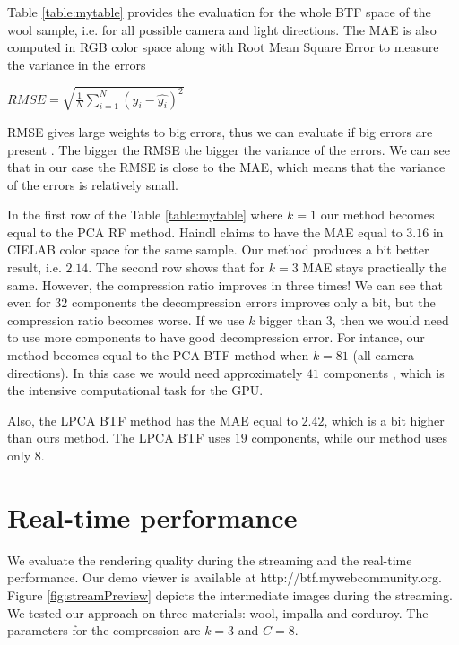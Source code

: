  Table \ref{table:mytable} provides the evaluation for the whole BTF space of the wool sample, i.e. for all possible camera and light directions.
 The MAE is also computed in RGB color space along with Root Mean Square Error to measure the variance in the errors
 
 {\centering $RMSE = \sqrt{\frac{1}{N}\sum_{i=1}^{N}(y_i-\hat{y_i} )^2}$\\}

 RMSE gives large weights to big errors, thus we can evaluate if big errors are present \cite{rmse}.
 The bigger the RMSE the bigger the variance of the errors. We can see that in our case the RMSE is close to the MAE, which means that the variance of the errors is relatively small.
 
In the first row of the  Table \ref{table:mytable} where $k=1$ our method becomes equal to the PCA RF \cite{haindl} method.
Haindl \cite{haindl} claims to have the MAE equal to $3.16$ in CIELAB color space for the same sample.
 Our method produces a bit better result, i.e. $2.14$. 
 The second row shows that for  $k=3$ MAE stays practically the same. 
 However, the compression ratio improves in three times!
 We can see that even for $32$ components the decompression errors improves only a bit, but the compression ratio becomes worse.
 If we use $k$ bigger than $3$, then we would need to use more components to have good decompression error.
 For intance, our method becomes equal to the PCA BTF \cite{haindl} method when $k=81$ (all camera directions). 
 In this case we would need approximately $41$ components \cite{haindl}, which is the intensive computational task for the GPU.
 
 Also, the LPCA BTF \cite{haindl} method has the MAE equal to $2.42$, which is a bit higher than ours method. 
 The LPCA BTF uses $19$ components, while our method uses only $8$.
 
 

\section{Real-time performance}
\label{section:eval_streaming}

We evaluate the rendering quality during the streaming and the real-time performance.
Our demo viewer is available at  http://btf.mywebcommunity.org. 
Figure \ref{fig:streamPreview} depicts the intermediate images during the streaming.
We tested our approach on three materials: wool, impalla and corduroy.
The parameters for the compression are $k=3$ and $C=8$.

